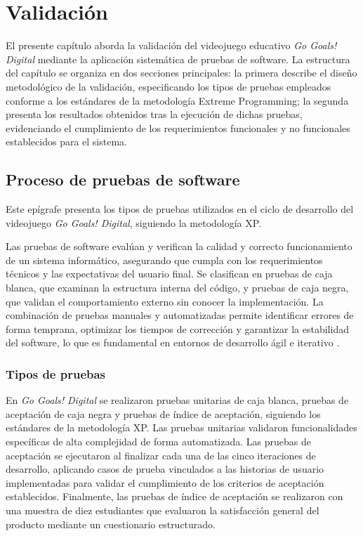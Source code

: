 \chapter{Validación}
\label{chap:chapter3}

El presente capítulo aborda la validación del videojuego educativo \textit{Go Goals! Digital} mediante la aplicación sistemática de pruebas de software. La estructura del capítulo se organiza en dos secciones principales: la primera describe el diseño metodológico de la validación, especificando los tipos de pruebas empleados conforme a los estándares de la metodología Extreme Programming; la segunda presenta los resultados obtenidos tras la ejecución de dichas pruebas, evidenciando el cumplimiento de los requerimientos funcionales y no funcionales establecidos para el sistema.

\section{Proceso de pruebas de software}
\label{sec:diseno_validacion}

Este epígrafe presenta los tipos de pruebas utilizados en el ciclo de desarrollo del videojuego \textit{Go Goals! Digital}, siguiendo la metodología XP.

Las pruebas de software evalúan y verifican la calidad y correcto funcionamiento de un sistema informático, asegurando que cumpla con los requerimientos técnicos y las expectativas del usuario final. Se clasifican en pruebas de caja blanca, que examinan la estructura interna del código, y pruebas de caja negra, que validan el comportamiento externo sin conocer la implementación. La combinación de pruebas manuales y automatizadas permite identificar errores de forma temprana, optimizar los tiempos de corrección y garantizar la estabilidad del software, lo que es fundamental en entornos de desarrollo ágil e iterativo \parencite{Pressman2019}.

\subsection{Tipos de pruebas}
\label{subsec:tipos_pruebas}

En \textit{Go Goals! Digital} se realizaron pruebas unitarias de caja blanca, pruebas de aceptación de caja negra y pruebas de índice de aceptación, siguiendo los estándares de la metodología XP. Las pruebas unitarias validaron funcionalidades específicas de alta complejidad de forma automatizada. Las pruebas de aceptación se ejecutaron al finalizar cada una de las cinco iteraciones de desarrollo, aplicando casos de prueba vinculados a las historias de usuario implementadas para validar el cumplimiento de los criterios de aceptación establecidos. Finalmente, las pruebas de índice de aceptación se realizaron con una muestra de diez estudiantes que evaluaron la satisfacción general del producto mediante un cuestionario estructurado.

